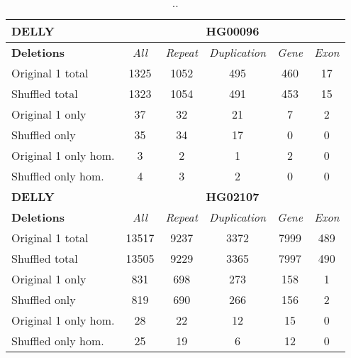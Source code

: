 \begin{table}[htb]
\begin{center}
\begin{tabular}{|l|c||c|c|c|c|}
\hline
{\bf DELLY} & \multicolumn{5}{|c|}{\bf HG00096} \\
\hline
\cline{2-6}
{\bf Deletions} & {\it All} & {\it Repeat} & {\it Duplication} & {\it Gene} & {\it Exon} \\
\hline
Original 1 total & 1325 & 1052 & 495 & 460 & 17\\ 
\hline
Shuffled total & 1323 & 1054 & 491 & 453 & 15\\ 
\hline
Original 1 only & 37 & 32 & 21 & 7 & 2\\ 
\hline
Shuffled only & 35 & 34 & 17 & 0 & 0\\ 
\hline
Original 1 only hom. & 3 & 2 & 1 & 2 & 0\\ 
\hline
Shuffled only hom. & 4 & 3 & 2 & 0 & 0\\ 
\hline
\hline
{\bf DELLY} & \multicolumn{5}{|c|}{\bf HG02107} \\
\hline
\cline{2-6}
{\bf Deletions} & {\it All} & {\it Repeat} & {\it Duplication} & {\it Gene} & {\it Exon} \\
\hline
Original 1 total & 13517 & 9237 & 3372 & 7999 & 489\\ 
\hline
Shuffled total & 13505 & 9229 & 3365 & 7997 & 490\\ 
\hline
Original 1 only & 831 & 698 & 273 & 158 & 1\\ 
\hline
Shuffled only & 819 & 690 & 266 & 156 & 2\\ 
\hline
Original 1 only hom. & 28 & 22 & 12 & 15 & 0\\ 
\hline
Shuffled only hom. & 25 & 19 & 6 & 12 & 0\\ 
\hline
\end{tabular}
\end{center}
\caption{ .. }
\label{tab:orig-vs-shuf-delly-deletions}
\end{table}

